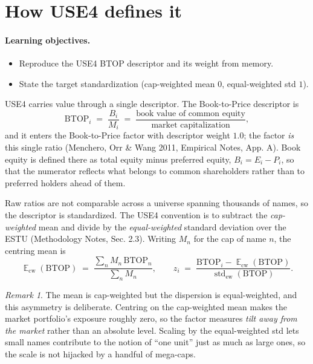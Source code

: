 \documentclass[11pt]{article}
\theoremstyle{definition}
\theoremstyle{plain}
\theoremstyle{remark}
\newtheorem*{remark}{Remark}
\DeclareMathOperator{\std}{std}
\DeclareMathOperator*{\avg}{\mathbb{E}}
\begin{document}
\section{How USE4 defines it}\label{sec:def}

\paragraph{Learning objectives.}
\begin{itemize}[leftmargin=1.4em,nosep]
  \item Reproduce the USE4 BTOP descriptor and its weight from memory.
  \item State the target standardization (cap-weighted mean $0$, equal-weighted std $1$).
\end{itemize}

USE4 carries value through a single descriptor. The Book-to-Price descriptor is
\[
  \mathrm{BTOP}_i \;=\; \frac{B_i}{M_i}
  \;=\; \frac{\text{book value of common equity}}{\text{market capitalization}},
\]
and it enters the Book-to-Price factor with descriptor weight $1.0$; the factor \emph{is} this single ratio (Menchero, Orr \& Wang 2011, Empirical Notes, App. A). Book equity is defined there as total equity minus preferred equity, $B_i = E_i - P_i$, so that the numerator reflects what belongs to common shareholders rather than to preferred holders ahead of them.

Raw ratios are not comparable across a universe spanning thousands of names, so the descriptor is standardized. The USE4 convention is to subtract the \emph{cap-weighted} mean and divide by the \emph{equal-weighted} standard deviation over the ESTU (Methodology Notes, Sec. 2.3). Writing $M_n$ for the cap of name $n$, the centring mean is
\[
  \avg_{\mathrm{cw}}(\mathrm{BTOP}) \;=\; \frac{\sum_n M_n\, \mathrm{BTOP}_n}{\sum_n M_n},
  \qquad
  z_i \;=\; \frac{\mathrm{BTOP}_i - \avg_{\mathrm{cw}}(\mathrm{BTOP})}
                  {\std_{\mathrm{ew}}(\mathrm{BTOP})}.
\]

\begin{remark}
The mean is cap-weighted but the dispersion is equal-weighted, and this asymmetry is deliberate. Centring on the cap-weighted mean makes the market portfolio's exposure roughly zero, so the factor measures \emph{tilt away from the market} rather than an absolute level. Scaling by the equal-weighted std lets small names contribute to the notion of ``one unit'' just as much as large ones, so the scale is not hijacked by a handful of mega-caps.
\end{remark}
\end{document}
